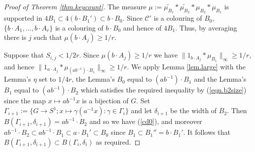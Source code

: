 \documentclass[12pt,reqno]{amsart}
\providecommand{\wt}{\widetilde}
\numberwithin{equation}{section}
\begin{document}
\begin{proof}[Proof of Theorem \ref{thm.keycount}]
The measure $\mu:=\wt{\mu_{B_1}} \ast \wt{\mu_{B_2}} \ast \mu_{B_2} \ast \mu_{B_1}$ is supported in $4B_1 \subset 4(b\cdot B_1') \subset b\cdot B_0$. Since $\mathcal{C}'$ is a colouring of $B_0$, $\{b\cdot A_1,\dots,b\cdot A_r\}$ is a colouring of $b\cdot B_0$ and hence of $4 B_1$. Thus, by averaging there is $j$ such that $\mu(b \cdot A_j) \geq 1/r$.

Suppose that $S_{i,j} < 1/2r$. Since $\mu(b \cdot A_j) \geq 1/r$ we have $\|1_{b \cdot A_j} \ast \mu_{B_1}\|_{\infty} \geq 1/r$, and hence $\|1_{a\cdot A_j} \ast \mu_{(ab^{-1})\cdot B_1}\|_\infty \geq 1/r$. We apply Lemma \ref{lem.large} with the Lemma's $\eta$ set to $1/4r$, the Lemma's $B_0$ equal to $(ab^{-1})\cdot B_1$ and the Lemma's $B_1$ equal to $(ab^{-1})\cdot B_2$ which satisfies the required inequality by (\ref{eqn.b2size}) since the map $x \mapsto ab^{-1}x$ is a bijection of $G$. Set $\Gamma_{i+1}:=\{G \rightarrow S^1; x \mapsto \gamma(a^{-1}x): \gamma \in \Gamma_i\}$ and let $\delta_{i+1}$ be the width of $B_2$. Then $B(\Gamma_{i+1},\delta_{i+1})=ab^{-1}\cdot B_2$ and so we have (\ref{cd0}), and moreover $ab^{-1}\cdot B_2 \subset ab^{-1}\cdot B_1 \subset a\cdot B_1' \subset B_0$ since $B_1 \subset B_1'' = b\cdot B_1'$. It follows that $B(\Gamma_{i+1},\delta_{i+1}) \subset B(\Gamma_i,\delta_i)$ as required.


\end{proof}
\end{document}
